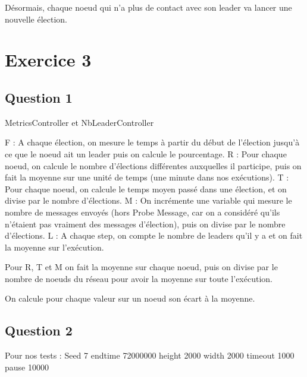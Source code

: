 \documentclass[paper=a4, fontsize=11pt]{article} %
\begin{document}
Désormais, chaque noeud qui n'a plus de contact avec son leader va lancer une nouvelle élection.
\newpage
\section{Exercice 3}

\subsection{Question 1}
MetricsController et NbLeaderController


F : A chaque élection, on mesure le temps à partir du début de l'élection jusqu'à ce que le noeud ait un leader puis on calcule le pourcentage. \newline
R : Pour chaque noeud, on calcule le nombre d'élections différentes auxquelles il participe, puis on fait la moyenne sur une unité de temps (une minute dans nos exécutions). \newline
T : Pour chaque noeud, on calcule le temps moyen passé dans une élection, et on divise par le nombre d'élections. \newline
M : On incrémente une variable qui mesure le nombre de messages envoyés (hors Probe Message, car on a considéré qu'ils n'étaient pas vraiment des messages d'élection), puis on divise par le nombre d'élections.
L : A chaque step, on compte le nombre de leaders qu'il y a et on fait la moyenne sur l'exécution.

Pour R, T et M on fait la moyenne sur chaque noeud, puis on divise par le nombre de noeuds du réseau pour avoir la moyenne sur toute l'exécution.

On calcule pour chaque valeur sur un noeud son écart à la moyenne.


\subsection{Question 2}

Pour nos tests :\newline
Seed 7\newline
endtime 72000000 \newline
height 2000 \newline
width  2000 \newline
timeout 1000\newline
pause 10000\newline
\end{document}

